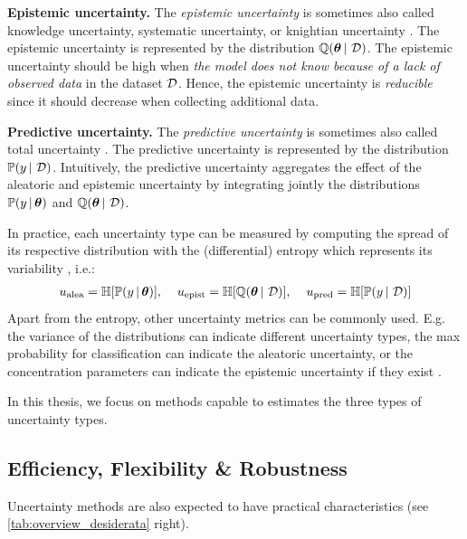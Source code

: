 \textbf{Epistemic uncertainty.} The \emph{epistemic uncertainty} is sometimes also called knowledge uncertainty, systematic uncertainty, or knightian uncertainty \cite{hullermeier2021aleatoric,knight1921,malini2018}.
The epistemic uncertainty is represented by the distribution $\operatorname{\mathbb{Q}}(\bm{\theta} \,|\, \operatorname{\mathcal{D}})$.
The epistemic uncertainty should be high when \emph{the model does not know because of a lack of observed data} in the dataset $\operatorname{\mathcal{D}}$.
Hence, the epistemic uncertainty is \emph{reducible} since it should decrease when collecting additional data.

\textbf{Predictive uncertainty.} The \emph{predictive uncertainty} is sometimes also called total uncertainty \cite{hullermeier2021aleatoric,malini2018}.
The predictive uncertainty is represented by the distribution $\mathbb{P}(y \,|\, \operatorname{\mathcal{D}})$.
Intuitively, the predictive uncertainty aggregates the effect of the aleatoric and epistemic uncertainty by integrating jointly the distributions $\mathbb{P}(y \,|\, \bm{\theta})$ and $\operatorname{\mathbb{Q}}(\bm{\theta} \,|\, \operatorname{\mathcal{D}})$.

In practice, each uncertainty type can be measured by computing the spread of its respective distribution with the (differential) entropy which represents its variability \citep{PriorNetworks,uncertainty-deep-learning}, i.e.:
\begin{align}
     u_\text{alea} = \operatorname{\mathbb{H}}[\mathbb{P}(y \,|\, \bm{\theta})], \hspace{4mm}
     u_\text{epist} = \operatorname{\mathbb{H}}[\operatorname{\mathbb{Q}}(\bm{\theta} \,|\, \operatorname{\mathcal{D}})], \hspace{4mm}
     u_\text{pred} = \operatorname{\mathbb{H}}[\mathbb{P}(y \,|\, \operatorname{\mathcal{D}})]
\end{align}
Apart from the entropy, other uncertainty metrics can be commonly used. E.g. the variance of the distributions can indicate different uncertainty types, the max probability for classification \cite{malini2018} can indicate the aleatoric uncertainty, or the concentration parameters can indicate the epistemic uncertainty if they exist \cite{charpentier2020}.

In this thesis, we focus on methods capable to estimates the three types of uncertainty types.

\subsection{Efficiency, Flexibility \& Robustness}

Uncertainty methods are also expected to have practical characteristics (see \cref{tab:overview_desiderata} right). 


